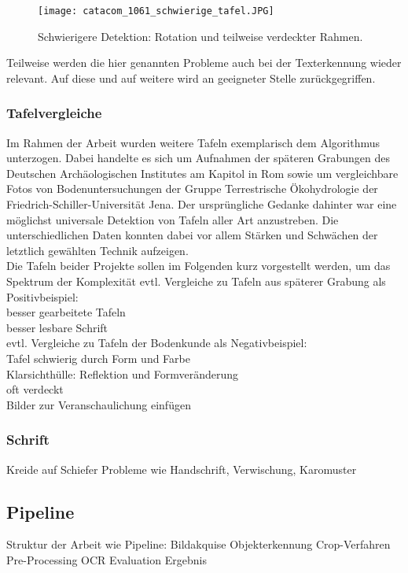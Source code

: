 \begin{figure}[!h]
\centering
\texttt{[image: catacom\_1061\_schwierige\_tafel.JPG]}
\caption{Schwierigere Detektion: Rotation und teilweise verdeckter Rahmen.}
\label{fig:schwierigetafel}
\end{figure}
Teilweise werden die hier genannten Probleme auch bei der Texterkennung wieder relevant. Auf diese und auf weitere wird an geeigneter Stelle zurückgegriffen.


\subsubsection{Tafelvergleiche}

Im Rahmen der Arbeit wurden weitere Tafeln exemplarisch dem Algorithmus unterzogen. Dabei handelte es sich um Aufnahmen der späteren Grabungen des Deutschen Archäologischen Institutes am Kapitol in Rom sowie um vergleichbare Fotos von Bodenuntersuchungen der Gruppe Terrestrische Ökohydrologie der Friedrich-Schiller-Universität Jena. Der ursprüngliche Gedanke dahinter war eine möglichst universale Detektion von Tafeln aller Art anzustreben. Die unterschiedlichen Daten konnten dabei vor allem Stärken und Schwächen der letztlich gewählten Technik aufzeigen.\\
Die Tafeln beider Projekte sollen im Folgenden kurz vorgestellt werden, um das Spektrum der Komplexität 
evtl. Vergleiche zu Tafeln aus späterer Grabung als Positivbeispiel:\\
besser gearbeitete Tafeln\\
besser lesbare Schrift\\
evtl. Vergleiche zu Tafeln der Bodenkunde als Negativbeispiel:\\
Tafel schwierig durch Form und Farbe\\
Klarsichthülle: Reflektion und Formveränderung\\
oft verdeckt\\
Bilder zur Veranschaulichung einfügen

\subsubsection{Schrift}
Kreide auf Schiefer
Probleme wie Handschrift, Verwischung, Karomuster
\subsection{Pipeline}
Struktur der Arbeit wie Pipeline:
Bildakquise
Objekterkennung
Crop-Verfahren
Pre-Processing
OCR
Evaluation
Ergebnis
